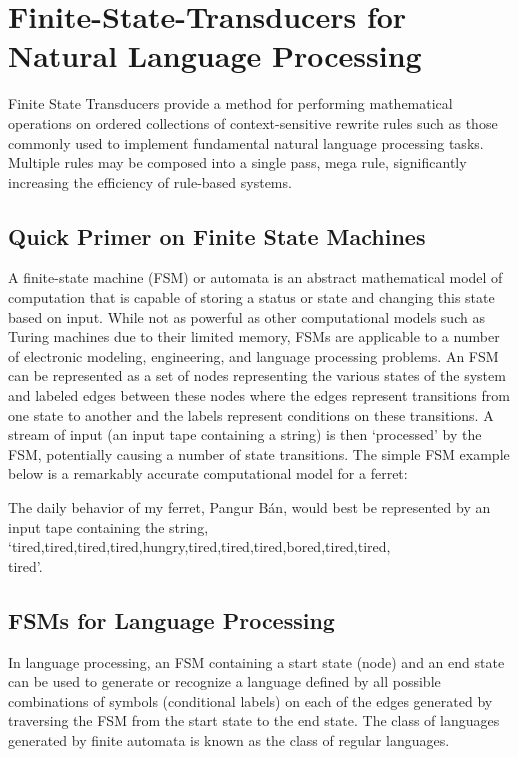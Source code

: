 
\chapter{Finite-State-Transducers for Natural Language Processing}
Finite State Transducers provide a method for performing mathematical operations on ordered collections of context-sensitive rewrite rules such as those commonly used to implement fundamental natural language processing tasks. Multiple rules may be composed into a single pass, mega rule, significantly increasing the efficiency of rule-based systems.
\section{Quick Primer on Finite State Machines}
A finite-state machine (FSM) or automata is an abstract mathematical model of computation that is capable of storing a status or state and changing this state based on input. While not as powerful as other computational models such as Turing machines due to their limited memory, FSMs are applicable to a number of electronic modeling, engineering, and language processing problems. An FSM can be represented as a set of nodes representing the various states of the system and labeled edges between these nodes where the edges represent transitions from one state to another and the labels represent conditions on these transitions. A stream of input (an input tape containing a string) is then ‘processed’ by the FSM, potentially causing a number of state transitions. The simple FSM example below is a remarkably accurate computational model for a ferret:


The daily behavior of my ferret, Pangur Bán, would best be represented by an input tape containing the string, ‘tired,tired,tired,tired,hungry,tired,tired,tired,bored,tired,tired,\\tired’.
\newpage
\section{FSMs for Language Processing}
In language processing, an FSM containing a start state (node) and an end state can be used to generate or recognize a language defined by all possible combinations of symbols (conditional labels) on each of the edges generated by traversing the FSM from the start state to the end state. The class of languages generated by finite automata is known as the class of regular languages.
